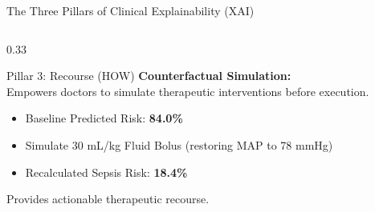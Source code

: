 \documentclass[aspectratio=169, 10pt]{beamer}
\begin{document}
\begin{frame}{The Three Pillars of Clinical Explainability (XAI)}
\begin{columns}[t]
        \begin{column}{0.33\textwidth}
            \begin{exampleblock}{Pillar 3: Recourse (HOW)}
                \tiny
                \textbf{Counterfactual Simulation:} \\
                Empowers doctors to simulate therapeutic interventions before execution.
                \vspace{0.2cm}
                \begin{itemize}
                    \tiny
                    \item Baseline Predicted Risk: \textbf{84.0\%}
                    \item Simulate 30 mL/kg Fluid Bolus (restoring MAP to 78 mmHg)
                    \item Recalculated Sepsis Risk: \textbf{18.4\%}
                \end{itemize}
                Provides actionable therapeutic recourse.
            \end{exampleblock}
        \end{column}
    \end{columns}
\end{frame}
\end{document}
